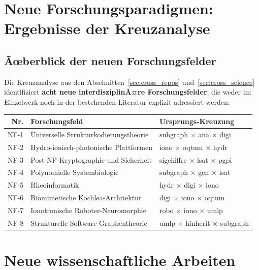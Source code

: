 ﻿\documentclass[a4paper,12pt]{scrreprt}
\theoremstyle{definition}
\begin{document}
\section{Neue Forschungsparadigmen:  \\
  Ergebnisse der Kreuzanalyse}
\label{sec:paradigmen}

\subsection{Ãœberblick der neuen Forschungsfelder}

Die Kreuzanalyse aus den Abschnitten~\ref{sec:cross_repos} und~\ref{sec:cross_science}
identifiziert \textbf{acht neue interdisziplinÃ¤re Forschungsfelder}, die weder
im Einzelwerk noch in der bestehenden Literatur explizit adressiert werden:

\begin{center}
\begin{tabular}{rll}
\toprule
\textbf{Nr.} & \textbf{Forschungsfeld} & \textbf{Ursprungs-Kreuzung} \\
\midrule
NF-1 & Universelle Strukturkodierungstheorie & subgraph $\times$ ana $\times$ digi \\
NF-2 & Hydro-ionisch-photonische Plattformen & iono $\times$ oqtum $\times$ hydr \\
NF-3 & Post-NP-Kryptographie und Sicherheit   & sigchiffre $\times$ lsat $\times$ pgpi \\
NF-4 & Polynomielle Systembiologie            & subgraph $\times$ gen $\times$ lsat \\
NF-5 & Rheoinformatik                         & hydr $\times$ digi $\times$ iono \\
NF-6 & Biomimetische Kochlea-Architektur      & digi $\times$ iono $\times$ oqtum \\
NF-7 & Ionotronische Roboter-Neuromorphie     & robo $\times$ iono $\times$ umlp \\
NF-8 & Strukturelle Software-Graphentheorie   & umlp $\times$ hinherit $\times$ subgraph \\
\bottomrule
\end{tabular}
\end{center}

\section{Neue wissenschaftliche Arbeiten}
\label{sec:neue_arbeiten}
\end{document}
